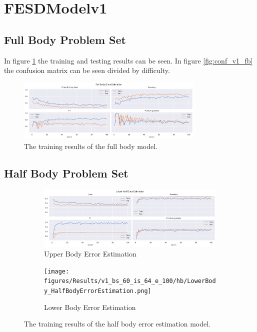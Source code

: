 
\section{FESDModelv1}

\subsection{Full Body Problem Set}
In figure \ref{fig:full_body_training_results_v1} the training and testing results can be seen. In figure \ref{fig:conf_v1_fb} the confusion matrix can be seen divided by difficulty.

\begin{figure}[ht]
  \centering
  \includegraphics[width=0.8\textwidth]{figures/Results/v1_bs_60_is_64_e_100/fb/FullBody_ErrorEstimation.png}
  \caption[Full Body model training results]{The training results of the full body model.}
  \label{fig:full_body_training_results_v1}
\end{figure}

\subsection{Half Body Problem Set}

\begin{figure}[ht]
  \centering
  \begin{subfigure}[b]{0.8\textwidth}
      \centering
      \includegraphics[width=\textwidth]{figures/Results/v1_bs_60_is_64_e_100/hb/UpperBody_HalfBodyErrorEstimation.png}
      \caption{Upper Body Error Estimation}
      \label{fig:uh_ee}
  \end{subfigure}
  \hfill
  \begin{subfigure}[b]{0.8\textwidth}
      \centering
      \texttt{[image: figures/Results/v1\_bs\_60\_is\_64\_e\_100/hb/LowerBody\_HalfBodyErrorEstimation.png]}
      \caption{Lower Body Error Estimation}
      \label{fig:lh_ee}
  \end{subfigure}
  \caption[Half Body model training results]{The training results of the half body error estimation model.}
     \label{fig:half_body_training_results}
\end{figure}

